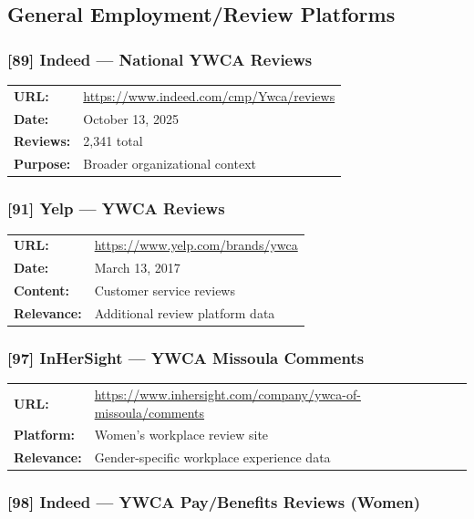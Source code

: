 \documentclass[11pt,letterpaper]{article}
\newcommand{\citeref}[1]{\textbf{\color{NavyBlue}[#1]}}
\begin{document}
\subsection{General Employment/Review Platforms}

\subsubsection{\citeref{89} Indeed --- National YWCA Reviews}

\begin{tabular}{@{}p{1.4in}p{4.6in}@{}}
\textbf{URL:} & \url{https://www.indeed.com/cmp/Ywca/reviews}\\
\textbf{Date:} & October 13, 2025\\
\textbf{Reviews:} & 2,341 total\\
\textbf{Purpose:} & Broader organizational context\\
\end{tabular}

\subsubsection{\citeref{91} Yelp --- YWCA Reviews}

\begin{tabular}{@{}p{1.4in}p{4.6in}@{}}
\textbf{URL:} & \url{https://www.yelp.com/brands/ywca}\\
\textbf{Date:} & March 13, 2017\\
\textbf{Content:} & Customer service reviews\\
\textbf{Relevance:} & Additional review platform data\\
\end{tabular}

\subsubsection{\citeref{97} InHerSight --- YWCA Missoula Comments}

\begin{tabular}{@{}p{1.4in}p{4.6in}@{}}
\textbf{URL:} & \url{https://www.inhersight.com/company/ywca-of-missoula/comments}\\
\textbf{Platform:} & Women's workplace review site\\
\textbf{Relevance:} & Gender-specific workplace experience data\\
\end{tabular}

\subsubsection{\citeref{98} Indeed --- YWCA Pay/Benefits Reviews (Women)}
\end{document}

